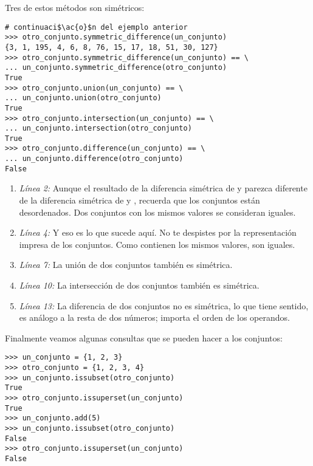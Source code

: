 Tres de estos métodos son simétricos:

\noindent\begin{minipage}{\textwidth}
\begin{lstlisting}[mathescape=True]
# continuaci$\ac{o}$n del ejemplo anterior
>>> otro_conjunto.symmetric_difference(un_conjunto)
{3, 1, 195, 4, 6, 8, 76, 15, 17, 18, 51, 30, 127}
>>> otro_conjunto.symmetric_difference(un_conjunto) == \
... un_conjunto.symmetric_difference(otro_conjunto)
True
>>> otro_conjunto.union(un_conjunto) == \
... un_conjunto.union(otro_conjunto)
True
>>> otro_conjunto.intersection(un_conjunto) == \
... un_conjunto.intersection(otro_conjunto)
True
>>> otro_conjunto.difference(un_conjunto) == \
... un_conjunto.difference(otro_conjunto)
False
\end{lstlisting}
\end{minipage}

\begin{enumerate}

\item \emph{Línea 2:} Aunque el resultado de la diferencia simétrica de  y  parezca diferente de la diferencia simétrica de  y , recuerda que los conjuntos están desordenados. Dos conjuntos con los mismos valores se consideran iguales.

\item \emph{Línea 4:} Y eso es lo que sucede aquí. No te despistes por la representación impresa de los conjuntos. Como contienen los mismos valores, son iguales.

\item \emph{Línea 7:} La unión de dos conjuntos también es simétrica. 

\item \emph{Línea 10:} La intersección de dos conjuntos también es simétrica.

\item \emph{Línea 13:} La diferencia de dos conjuntos no es simétrica, lo que tiene sentido, es análogo a la resta de dos números; importa el orden de los operandos.

\end{enumerate}

Finalmente veamos algunas consultas que se pueden hacer a los conjuntos:

\noindent\begin{minipage}{\textwidth}
\begin{lstlisting}[mathescape=True]
>>> un_conjunto = {1, 2, 3}
>>> otro_conjunto = {1, 2, 3, 4}
>>> un_conjunto.issubset(otro_conjunto)
True
>>> otro_conjunto.issuperset(un_conjunto)
True
>>> un_conjunto.add(5)
>>> un_conjunto.issubset(otro_conjunto)
False
>>> otro_conjunto.issuperset(un_conjunto)
False
\end{lstlisting}
\end{minipage}

